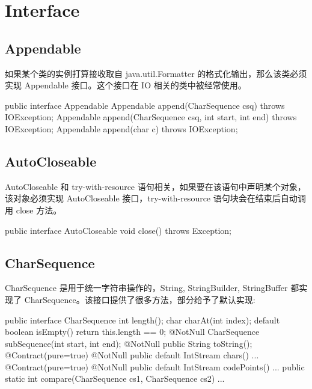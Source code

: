 \section{Interface}

\subsection{Appendable}

如果某个类的实例打算接收取自 java.util.Formatter 的格式化输出，那么该类必须实现 Appendable 接口。这个接口在 IO 相关的类中被经常使用。

\begin{Java}
public interface Appendable {
    Appendable append(CharSequence csq) throws IOException;
    Appendable append(CharSequence csq, int start, int end) throws IOException;
    Appendable append(char c) throws IOException;
}
\end{Java}

\subsection{AutoCloseable}

AutoCloseable 和 try-with-resource 语句相关，如果要在该语句中声明某个对象，该对象必须实现 AutoCloseable 接口，try-with-resource 语句块会在结束后自动调用 close 方法。

\begin{Java}
public interface AutoCloseable {
    void close() throws Exception;
}
\end{Java}

\subsection{CharSequence}

CharSequence 是用于统一字符串操作的，String, StringBuilder, StringBuffer 都实现了 CharSequence。该接口提供了很多方法，部分给予了默认实现:

\begin{Java}
public interface CharSequence {
    int length();
    char charAt(int index);
    default boolean isEmpty() {
        return this.length == 0;
    }
    @NotNull
    CharSequence subSequence(int start, int end);
    @NotNull
    public String toString();
    @Contract(pure=true) @NotNull
    public default IntStream chars() {...}
    @Contract(pure=true) @NotNull
    public default IntStream codePoints() {...}
    public static int compare(CharSequence cs1, CharSequence cs2) {...}
}
\end{Java}

